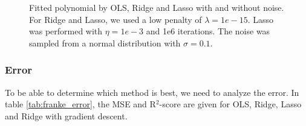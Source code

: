 \begin{figure} [H]
    \caption{Fitted polynomial by OLS, Ridge and Lasso with and without noise. For Ridge and Lasso, we used a low penalty of $\lambda=1e-15$. Lasso was performed with $\eta=1e-3$ and 1e6 iterations. The noise was sampled from a normal distribution with $\sigma=0.1$.}%
    \label{fig:franke_plots}%
\end{figure}
\restoregeometry


\subsubsection{Error}
To be able to determine which method is best, we need to analyze the error. In table \eqref{tab:franke_error}, the MSE and R$^2$-score are given for OLS, Ridge, Lasso and Ridge with gradient descent. 

